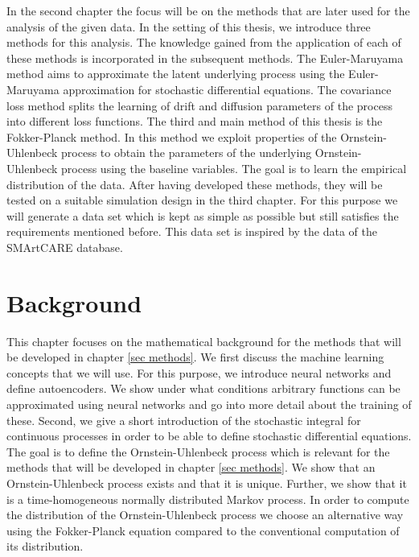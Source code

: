 \documentclass[11pt,titlepage]{article}
\theoremstyle{definition}
\theoremstyle{remark}
\begin{document}
	In the second chapter the focus will be on the methods that are later used for the analysis of the given data. In the setting of this thesis, we introduce three methods for this analysis. The knowledge gained from the application of each of these methods is incorporated in the subsequent methods. The Euler-Maruyama method aims to approximate the latent underlying process using the Euler-Maruyama approximation  for stochastic differential equations. The covariance loss method splits the learning of drift and diffusion parameters of the process into different loss functions. The third and main method of this thesis is the Fokker-Planck method. In this method we exploit properties of the Ornstein-Uhlenbeck process to obtain the parameters of the underlying Ornstein-Uhlenbeck process using the baseline variables. 
	The goal is to learn the empirical distribution of the data. 
	After having developed these methods, they will be tested on a suitable simulation design in the third chapter. For this purpose we will generate a data set which is kept as simple as possible but still satisfies the requirements mentioned before. This data set is inspired by the data of the SMArtCARE database.
	
	\newpage
	
	\section{Background} \label{sec_Background}
	
	This chapter focuses on the mathematical background for the methods that will be developed in chapter \ref{sec methods}. We first discuss the machine learning concepts that we will use. For this purpose, we introduce neural networks and define autoencoders. We show under what conditions arbitrary functions can be approximated using neural networks and go into more detail about the training of these. Second, we give a short introduction of the stochastic integral for continuous processes in order to be able to define stochastic differential equations. The goal is to define the Ornstein-Uhlenbeck process which is relevant for the methods that will be developed in chapter \ref{sec methods}. We show that an Ornstein-Uhlenbeck process exists and that it is unique. Further, we show that it is a time-homogeneous normally distributed Markov process. In order to compute the distribution of the Ornstein-Uhlenbeck process we choose an alternative way using the Fokker-Planck equation compared to the conventional computation of its distribution.
	
\end{document}
